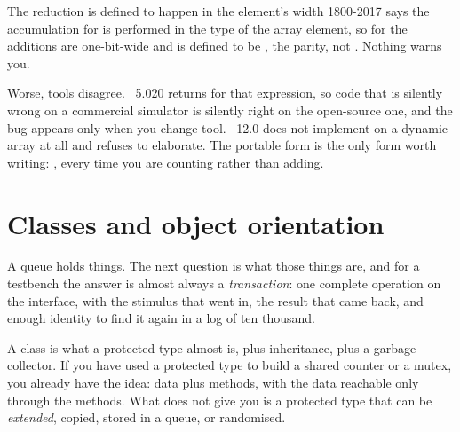 \begin{gotcha}{The reduction is defined to happen in the element's width}
1800-2017 says the accumulation for  is performed in the type of the
array element, so for  the additions are
one-bit-wide and  is defined to be , the parity, not
. Nothing warns you.

Worse, tools disagree. ~5.020 returns  for that
expression, so code that is silently wrong on a commercial simulator is
silently right on the open-source one, and the bug appears only when you
change tool. ~12.0 does not implement  on a
dynamic array at all and refuses to elaborate. The portable form is the only
form worth writing: , every time you are
counting rather than adding.
\end{gotcha}

\section{Classes and object orientation}
\label{sec:beyond:class}
\label{sec:toolkit:class}

A queue holds things. The next question is what those things are, and for a
testbench the answer is almost always a \emph{transaction}: one complete
operation on the interface, with the stimulus that went in, the result that
came back, and enough identity to find it again in a log of ten thousand.

A \SV{} class is what a \VHDL{} protected type almost is, plus inheritance,
plus a garbage collector. If you have used a protected type to build a shared
counter or a mutex, you already have the idea: data plus methods, with the
data reachable only through the methods. What \VHDL{} does not give you is a
protected type that can be \emph{extended}, copied, stored in a queue, or
randomised.


